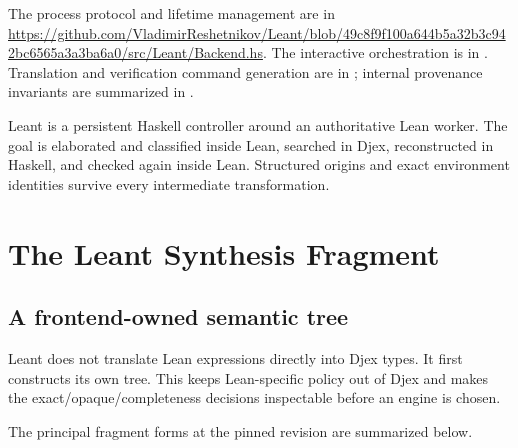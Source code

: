 \documentclass[10pt,letterpaper,oneside,openany]{report}
\newcommand{\term}[1]{\texttt{\detokenize{#1}}}
\begin{document}
\begin{sourcebox}
The process protocol and lifetime management are in \url{https://github.com/VladimirReshetnikov/Leant/blob/49c8f9f100a644b5a32b3c942bc6565a3a3ba6a0/src/Leant/Backend.hs}.  The interactive orchestration is in .  Translation and verification command generation are in ; internal provenance invariants are summarized in .
\end{sourcebox}

\begin{recapbox}
Leant is a persistent Haskell controller around an authoritative Lean worker.  The goal is elaborated and classified inside Lean, searched in Djex, reconstructed in Haskell, and checked again inside Lean.  Structured origins and exact environment identities survive every intermediate transformation.
\end{recapbox}

\chapter{The Leant Synthesis Fragment}\label{ch:fragment}

\section{A frontend-owned semantic tree}

Leant does not translate Lean expressions directly into Djex types.  It first constructs its own \term{Frag} tree.  This keeps Lean-specific policy out of Djex and makes the exact/opaque/completeness decisions inspectable before an engine is chosen.

The principal fragment forms at the pinned revision are summarized below.
\end{document}
